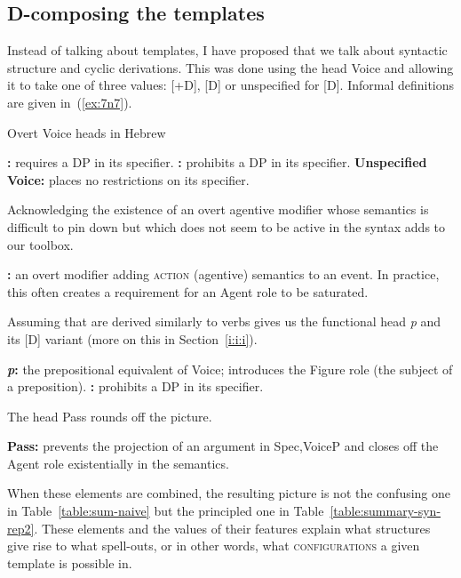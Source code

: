 \begin{exe}
\begin{xlist}
\begin{xlist}
\begin{xlist}
\begin{xlist}
\begin{xlist}
\begin{xlist}
	\subsection{D-composing the templates}
Instead of talking about templates, I have proposed that we talk about syntactic structure and cyclic derivations. This was done using the head Voice and allowing it to take one of three values: [+D], [\textminus{}D] or unspecified for [D]. Informal definitions are given in~(\ref{ex:7n7}).
 \begin{exe}
 \ex  \label{ex:7n7}Overt Voice heads in Hebrew 
 \begin{xlist} 
 \ex  \textbf{{\vd}:} requires a DP in its specifier. 
 \ex  \textbf{{\vz}:} prohibits a DP in its specifier. 
 \ex  \textbf{Unspecified Voice:} places no restrictions on its specifier. 
 \z
\z 

Acknowledging the existence of an overt agentive modifier whose semantics is difficult to pin down but which does not seem to be active in the syntax adds {\va} to our toolbox.
 \begin{exe}
\ex  \textbf{{\va}:} an overt modifier adding \textsc{action} (agentive) semantics to an event. In practice, this often creates a requirement for an Agent role to be saturated. 
 \z 

Assuming that  are derived similarly to verbs gives us the functional head \textit{p} and its [\textminus{}D] variant {\pz} (more on this in Section~\ref{i:i:i}).
 \begin{exe}
 \ex  
 \begin{xlist} 
 	\ex  \textbf{\textit{p}:} the prepositional equivalent of Voice; introduces the Figure role (the subject of a preposition). 
 	\ex  \textbf{{\pz}:} prohibits a DP in its specifier. 
 \z
\z 

The  head Pass rounds off the picture.
 \begin{exe}
\ex  \textbf{Pass:} prevents the projection of an argument in Spec,VoiceP and closes off the Agent role existentially in the semantics. 
 \z 

When these elements are combined, the resulting picture is not the confusing one in Table~\ref{table:sum-naive} but the principled one in Table~\ref{table:summary-syn-rep2}. These elements and the values of their features explain what structures give rise to what spell-outs, or in other words, what \textsc{configurations} a given template is possible in.
\begin{table}
\end{table}
\end{exe}
\end{xlist}
\end{exe}
\end{exe}
\end{xlist}
\end{exe}
\end{xlist}
\end{xlist}
\end{xlist}
\end{xlist}
\end{xlist}
\end{xlist}
\end{exe}

